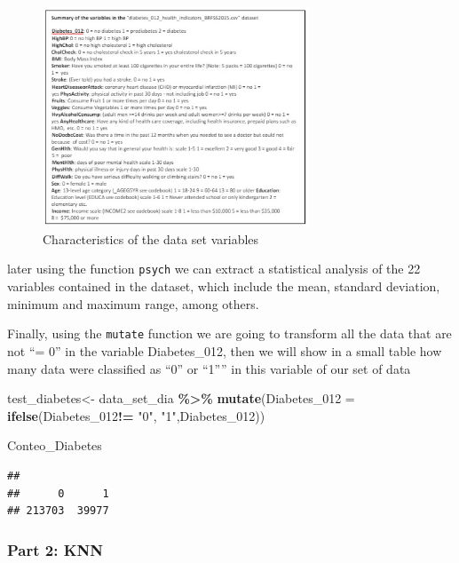 \documentclass[
]{article}
\newenvironment{Shaded}{\begin{snugshade}}{\end{snugshade}}
\newcommand{\AttributeTok}[1]{\textcolor[rgb]{0.13,0.29,0.53}{#1}}
\newcommand{\FunctionTok}[1]{\textcolor[rgb]{0.13,0.29,0.53}{\textbf{#1}}}
\newcommand{\NormalTok}[1]{#1}
\newcommand{\OtherTok}[1]{\textcolor[rgb]{0.56,0.35,0.01}{#1}}
\newcommand{\SpecialCharTok}[1]{\textcolor[rgb]{0.81,0.36,0.00}{\textbf{#1}}}
\newcommand{\StringTok}[1]{\textcolor[rgb]{0.31,0.60,0.02}{#1}}
\begin{document}
\begin{figure}
\centering
\includegraphics[width=3.125in,height=\textheight]{images/Captura de pantalla 2023-10-08 125457.jpg}
\caption{Characteristics of the data set variables}
\end{figure}

later using the function \texttt{psych} we can extract a statistical
analysis of the 22 variables contained in the dataset, which include the
mean, standard deviation, minimum and maximum range, among others.

Finally, using the \texttt{mutate} function we are going to transform
all the data that are not ``= 0'' in the variable Diabetes\_012, then we
will show in a small table how many data were classified as ``0'' or
``1'''' in this variable of our set of data

\begin{Shaded}
\begin{Highlighting}[]
\NormalTok{test\_diabetes}\OtherTok{\textless{}{-}}\NormalTok{ data\_set\_dia }\SpecialCharTok{\%\textgreater{}\%} \FunctionTok{mutate}\NormalTok{(}\AttributeTok{Diabetes\_012 =} \FunctionTok{ifelse}\NormalTok{(Diabetes\_012}\SpecialCharTok{!=} \StringTok{"0"}\NormalTok{, }\StringTok{"1"}\NormalTok{,Diabetes\_012))}
\end{Highlighting}
\end{Shaded}

\begin{Shaded}
\begin{Highlighting}[]
\NormalTok{Conteo\_Diabetes}
\end{Highlighting}
\end{Shaded}

\begin{verbatim}
## 
##      0      1 
## 213703  39977
\end{verbatim}

\hypertarget{part-2-knn}{%
\subsubsection{Part 2: KNN}\label{part-2-knn}}
\end{document}
